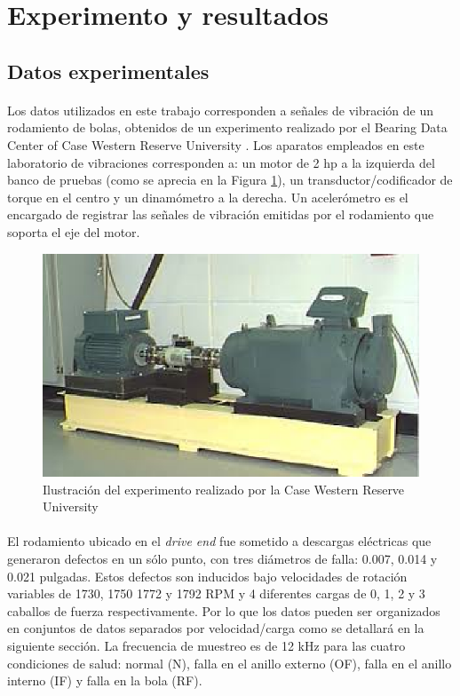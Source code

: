\documentclass[12pt]{article}%
\begin{document}
\section{Experimento y resultados}
\label{sec:exp}

\subsection{Datos experimentales}
\label{sec:datos}
\paragraph{}
Los datos utilizados en este trabajo corresponden a señales de vibración de un rodamiento de bolas, obtenidos de un experimento realizado por el Bearing Data Center of Case Western Reserve University \cite{case}. Los aparatos empleados en este laboratorio de vibraciones corresponden a: un motor de 2 hp a la izquierda del banco de pruebas (como se aprecia en la Figura \ref{fig:bearing}), un transductor/codificador de torque en el centro y un dinamómetro a la derecha. Un acelerómetro es el encargado de registrar las señales de vibración emitidas por el rodamiento que soporta el eje del motor.

\begin{figure}[ht]
  \centering
    \includegraphics[scale=0.8]{./bearing.eps}
  \caption{Ilustración del experimento realizado por la Case Western Reserve University \cite{case}}
  \label{fig:bearing}
\end{figure}

\paragraph{}
El rodamiento ubicado en el \textit{drive end} fue sometido a descargas eléctricas que generaron defectos en un sólo punto, con tres diámetros de falla: 0.007, 0.014 y 0.021 pulgadas. Estos defectos son inducidos bajo velocidades de rotación variables de 1730, 1750 1772 y 1792 RPM y 4 diferentes cargas de 0, 1, 2 y 3 caballos de fuerza respectivamente. Por lo que los datos pueden ser organizados en conjuntos de datos separados por velocidad/carga como se detallará en la siguiente sección. La frecuencia de muestreo es de 12 kHz para las cuatro condiciones de salud: normal (N), falla en el anillo externo (OF), falla en el anillo interno (IF) y falla en la bola (RF). 
\end{document}
